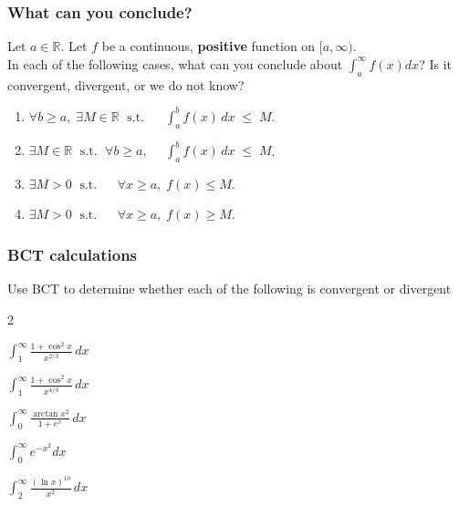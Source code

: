 \begin{frame}[t]
	\fontsize{13}{13}\selectfont
	\frametitle{What can you conclude?}

	Let $a \in \mathbb{R}$. Let $f$ be a continuous, {\bfseries positive} function
	on $[a, \infty)$. \\ In each of the following cases, what can you conclude about
	$\displaystyle \int_{a}^{\infty}f(x) dx$? \; Is it convergent, divergent, or
	we do not know?

	\begin{enumerate}
		\item $\displaystyle \forall b \geq a, \; \exists M \in \mathbb{R}\; \text{ s.t.
			}\; \quad \int_{a}^{b}f(x)\,dx \; \leq \; M$.

		\item $\displaystyle \exists M \in \mathbb{R}\; \text{ s.t. }\; \forall b \geq
			a, \; \quad \int_{a}^{b}f(x)\, dx \; \leq \; M$.
			\vspace{.3cm}

		\item $\displaystyle \exists M >0 \; \text{ s.t. }\; \quad \forall x \geq a,
			\; f(x) \leq M$.
			\vspace{.3cm}

		\item $\displaystyle \exists M >0 \; \text{ s.t. }\; \quad \forall x \geq a,
			\; f(x) \geq M$.
	\end{enumerate}
\end{frame}

\begin{frame}[t]
	\frametitle{BCT calculations}

	Use BCT to determine whether each of the following is convergent or divergent

	\begin{enumerate}
	\end{enumerate}
\end{frame}

